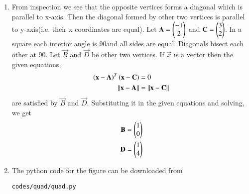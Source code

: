 \renewcommand{\theequation}{\theenumi}
\begin{enumerate}[label=\thesection.\arabic*.,ref=\thesection.\theenumi]
\begin{figure}[!ht]
\centering
\texttt{[image: ./figs/quad/quad.eps]}
\caption{Square ABCD}
\end{figure}
\item From inspection we see that the opposite vertices forms a diagonal which is parallel to x-axis. Then the diagonal formed by other two vertices is parallel to y-axis(i.e. their x coordinates are equal). Let $\mathbf{A}= \begin{pmatrix}-1\\2\end{pmatrix}$  and $\mathbf{C}=\begin{pmatrix}3\\2\end{pmatrix}$. In a square each interior angle is 90\degree and all sides are equal. Diagonals bisect each other at 90\degree.
Let $\vec{B}$ and $\vec{D}$ be other two vertices. If $\vec{x}$ is a vector then the given equations,
\begin{align}
\left(\mathbf{x}-\mathbf{A}\right)^T\left(\mathbf{x}-\mathbf{C}\right) &= 0 \\
\left\lVert\mathbf{x}-\mathbf{A}\right\rVert &= \left\lVert\mathbf{x}-\mathbf{C}\right\rVert 
\end{align}
are satisfied by $\vec{B}$ and $\vec{D}$. Substituting it in the given equations and solving, we get
\begin{align}
\mathbf{B}&= \begin{pmatrix}1\\0\end{pmatrix} \\
\mathbf{D}&= \begin{pmatrix}1\\4\end{pmatrix}
\end{align} 
\item The python code for the figure can be downloaded from
\begin{lstlisting}
codes/quad/quad.py
\end{lstlisting}
\end{enumerate}  